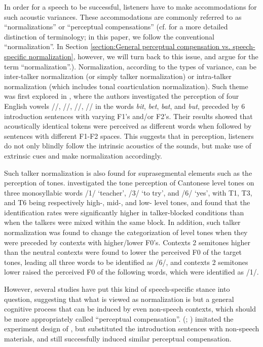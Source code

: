\documentclass[12pt]{report}
\newcommand{\tip}{\textipa}
\begin{document}
\begin{CJK}{UTF8}{bsmi}
In order for a speech to be successful, listeners have to make accommodations for such acoustic variances. These accommodations are commonly referred to as ``normalizations'' or ``perceptual compensations'' (cf. \cite{Zhangetal2022} for a more detailed distinction of terminology; in this paper, we follow the conventional ``normalization''. In Section \ref{section:General perceptual compensation vs. speech-specific normalization}, however, we will turn back to this issue, and argue for the term ``normalization''.). Normalization, according to the types of variance, can be inter-talker normalization (or simply talker normalization) or intra-talker normalization (which includes tonal coarticulation normalization). Such theme was first explored in \cite{LadefogedBroadbent1957}, where the authors investigated the perception of four English vowels /\tip{I}/, /\tip{E}/, /\tip{5}/, /\tip{2}/ in the words \textit{bit}, \textit{bet}, \textit{bat}, and \textit{but}, preceded by 6 introduction sentences with varying F1's and/or F2's. Their results showed that acoustically identical tokens were perceived as different words when followed by sentences with different F1-F2 spaces. This suggests that in perception, listeners do not only blindly follow the intrinsic acoustics of the sounds, but make use of extrinsic cues and make normalization accordingly.

Such talker normalization is also found for suprasegmental elements such as the perception of tones. \cite{WongDiehl2003} investigated the tone perception of Cantonese level tones on three monosyllabic words /\tip{si}1/ `teacher', /\tip{si}3/ `to try', and /\tip{si}6/ `yes', with T1, T3, and T6 being respectively high-, mid-, and low- level tones, and found that the identification rates were significantly higher in talker-blocked conditions than when the talkers were mixed within the same block. In addition, such talker normalization was found to change the categorization of level tones when they were preceded by contexts with higher/lower F0's. Contexts 2 semitones higher than the neutral contexts were found to lower the perceived F0 of the target tones, leading all three words to be identified as /\tip{si}6/, and contexts 2 semitones lower raised the perceived F0 of the following words, which were identified as /\tip{si}1/. 

However, several studies have put this kind of speech-specific stance into question, suggesting that what is viewed as normalization is but a general cognitive process that can be induced by even non-speech contexts, which should be more appropriately called ``perceptual compensation''. \citeauthor{WatkinsMakin1994} (\citeyear{WatkinsMakin1994}; \citeyear{WatkinsMakin1996}) imitated the experiment design of \cite{LadefogedBroadbent1957}, but substituted the introduction sentences with non-speech materials, and still successfully induced similar perceptual compensation. 


\end{CJK}
\end{document}
